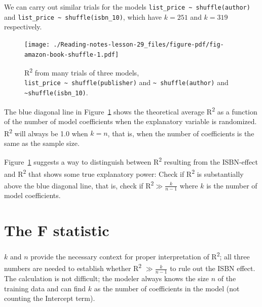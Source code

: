 \documentclass[
  letterpaper,
  DIV=11,
  numbers=noendperiod,
  oneside]{scrreprt}
\begin{document}
We can carry out similar trials for the models
\texttt{list\_price\ \textasciitilde{}\ shuffle(author)} and
\texttt{list\_price\ \textasciitilde{}\ shuffle(isbn\_10)}, which have
\(k=251\) and \(k=319\) respectively.

\begin{figure}

{\centering \texttt{[image: ./Reading-notes-lesson-29\_files/figure-pdf/fig-amazon-book-shuffle-1.pdf]}

}

\caption{\label{fig-amazon-book-shuffle}R\textsuperscript{2} from many
trials of three models,
\texttt{list\_price\ \textasciitilde{}\ shuffle(publisher)} and
\texttt{\textasciitilde{}\ shuffle(author)} and
\texttt{\textasciitilde{}shuffle(isbn\_10)}.}

\end{figure}

The blue diagonal line in Figure~\ref{fig-amazon-book-shuffle} shows the
theoretical average R\textsuperscript{2} as a function of the number of
model coefficients when the explanatory variable is randomized.
R\textsuperscript{2} will always be 1.0 when \(k=n\), that is, when the
number of coefficients is the same as the sample size.

Figure~\ref{fig-amazon-book-shuffle} suggests a way to distinguish
between R\textsuperscript{2} resulting from the ISBN-effect and
R\textsuperscript{2} that shows some true explanatory power: Check if
R\textsuperscript{2} is substantially above the blue diagonal line, that
is, check if R\textsuperscript{2}\(\gg \frac{k}{n-1}\) where \(k\) is
the number of model coefficients.

\hypertarget{the-f-statistic}{%
\section{The F statistic}\label{the-f-statistic}}

\(k\) and \(n\) provide the necessary context for proper interpretation
of R\textsuperscript{2}; all three numbers are needed to establish
whether R\textsuperscript{2} \(\gg \frac{k}{n-1}\) to rule out the ISBN
effect. The calculation is not difficult; the modeler always knows the
size \(n\) of the training data and can find \(k\) as the number of
coefficients in the model (not counting the Intercept term).
\end{document}
